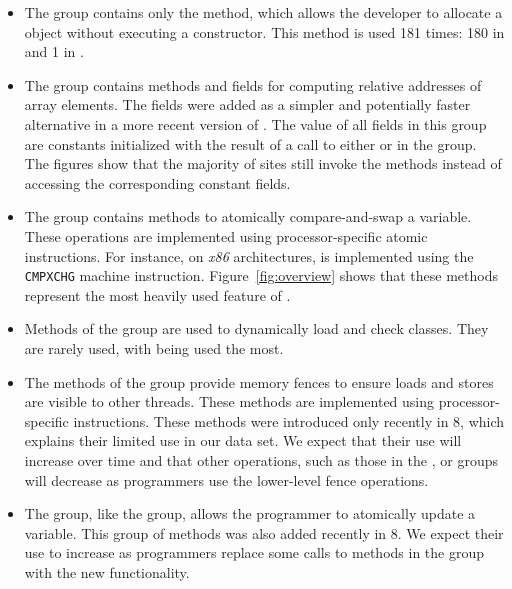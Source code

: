 \begin{itemize}
  
\item The  group contains only the   method, 
which allows the developer to allocate a \java{} object without executing a constructor.
This method is used 181 times: 180 in  and 1 in .

\item The  group contains methods and fields for computing relative addresses of array elements.
The fields were added as a simpler and potentially faster alternative in a more recent version of \unsafe{}.
The value of all fields in this group are constants initialized with the result of a call to either  or  in the  group.
The figures show that the majority of sites still invoke the methods instead of accessing the corresponding constant fields.

\item The  group contains methods to atomically compare-and-swap a \java{} variable. These operations are implemented using processor-specific atomic instructions. For instance, on \emph{x86} architectures,  is implemented using the \texttt{CMPXCHG} machine instruction. Figure~\ref{fig:overview} shows that these methods represent the most heavily used feature of \unsafe{}.

\item Methods of the  group are used to dynamically load and check \java{} classes. They are rarely used, with  being used the most.

\item 
The methods of the  group provide memory fences to ensure loads and stores are visible to other threads.
These methods are implemented using processor-specific instructions.
These methods were introduced only recently in \java{} 8, which explains their limited use in our data set.
We expect that their use will increase over time and that other operations, such as those in the , or  groups will decrease as programmers use the lower-level fence operations.

\item The  group, like the  group, allows the programmer to atomically update a \java{} variable. This group of methods was also added recently in \java{} 8. We expect their use to increase as programmers replace some calls to methods in the  group with the new functionality.


\end{itemize}
